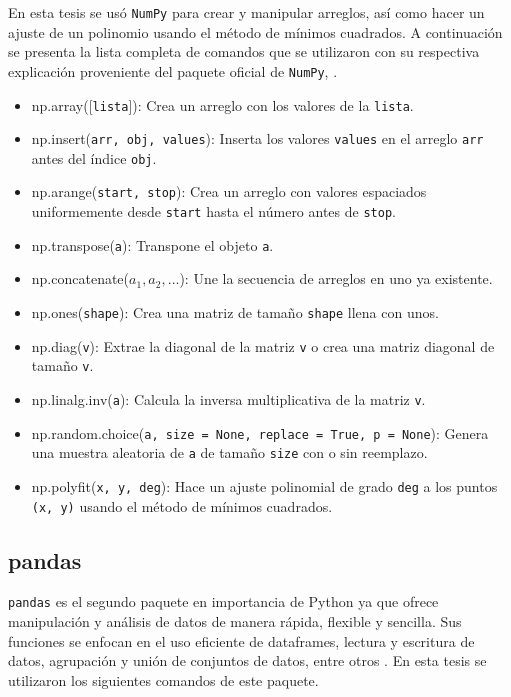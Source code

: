 En esta tesis se usó \texttt{NumPy} para crear y manipular arreglos, así como hacer un ajuste de un polinomio usando el método de mínimos cuadrados. A continuación se presenta la lista completa de comandos que se utilizaron con su respectiva explicación proveniente del paquete oficial de \texttt{NumPy}, \cite{numpy_manual}. 

\begin{itemize}
	\item np.array([\texttt{lista}]): Crea un arreglo con los valores de la \texttt{lista}.
	
	\item np.insert(\texttt{arr, obj, values}): Inserta los valores \texttt{values} en el arreglo \texttt{arr} antes del índice \texttt{obj}.
	
	\item np.arange(\texttt{start, stop}): Crea un arreglo con valores espaciados uniformemente desde \texttt{start} hasta el número antes de \texttt{stop}. 
	
	\item np.transpose(\texttt{a}): Transpone el objeto \texttt{a}.
	
	\item np.concatenate(\texttt{$a_1, a_2, \dots $}): Une la secuencia de arreglos en uno ya existente.
	
	\item np.ones(\texttt{shape}): Crea una matriz de tamaño \texttt{shape} llena con unos.
	
	\item np.diag(\texttt{v}): Extrae la diagonal de la matriz \texttt{v} o crea una matriz diagonal de tamaño \texttt{v}.
	
	\item np.linalg.inv(\texttt{a}): Calcula la inversa multiplicativa de la matriz \texttt{v}. 
	
	\item np.random.choice(\texttt{a, size = None, replace = True, p = None}): Genera una muestra aleatoria de \texttt{a} de tamaño \texttt{size} con o sin reemplazo. 
	
	\item np.polyfit(\texttt{x, y, deg}): Hace un ajuste polinomial de grado \texttt{deg} a los puntos \texttt{(x, y)} usando el método de mínimos cuadrados. 
	
\end{itemize}


\subsection{pandas}
\texttt{pandas} \citep{software_pandas} es el segundo paquete en importancia de \textsf{Python} ya que ofrece manipulación y análisis de datos de manera rápida, flexible y sencilla. Sus funciones se enfocan en el uso eficiente de dataframes, lectura y escritura de datos, agrupación y unión de conjuntos de datos, entre otros \citep{pandas_manual}. En esta tesis se utilizaron los siguientes comandos de este paquete.

